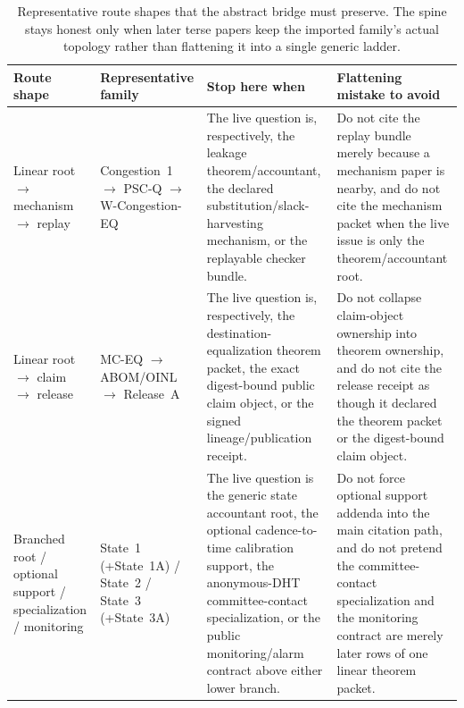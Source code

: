\documentclass[11pt]{article}
\begin{document}
\begin{table}[t]
\centering
\small
\begin{tabularx}{\linewidth}{@{}L Y Y Y@{}}
\toprule
Route shape & Representative family & Stop here when & Flattening mistake to avoid \\
\midrule
Linear root $\to$ mechanism $\to$ replay & Congestion~1 $\to$ PSC-Q $\to$ W-Congestion-EQ & The live question is, respectively, the leakage theorem/accountant, the declared substitution/slack-harvesting mechanism, or the replayable checker bundle. & Do not cite the replay bundle merely because a mechanism paper is nearby, and do not cite the mechanism packet when the live issue is only the theorem/accountant root. \\
Linear root $\to$ claim $\to$ release & MC-EQ $\to$ ABOM/OINL $\to$ Release~A & The live question is, respectively, the destination-equalization theorem packet, the exact digest-bound public claim object, or the signed lineage/publication receipt. & Do not collapse claim-object ownership into theorem ownership, and do not cite the release receipt as though it declared the theorem packet or the digest-bound claim object. \\
Branched root / optional support / specialization / monitoring & State~1 (+State~1A) / State~2 / State~3 (+State~3A) & The live question is the generic state accountant root, the optional cadence-to-time calibration support, the anonymous-DHT committee-contact specialization, or the public monitoring/alarm contract above either lower branch. & Do not force optional support addenda into the main citation path, and do not pretend the committee-contact specialization and the monitoring contract are merely later rows of one linear theorem packet. \\
\bottomrule
\end{tabularx}
\caption{Representative route shapes that the abstract bridge must preserve. The spine stays honest only when later terse papers keep the imported family's actual topology rather than flattening it into a single generic ladder.}
\label{tab:seriesspine-route-shapes}
\end{table}
\end{document}
